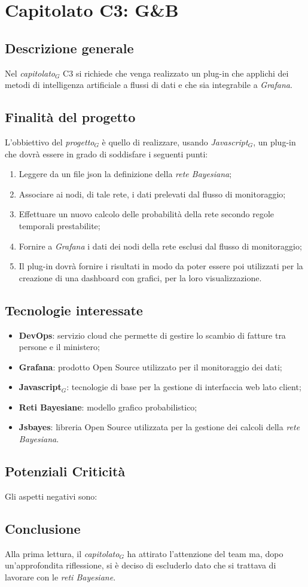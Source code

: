 \chapter{Capitolato C3: G\&B}
\section{Descrizione generale}
Nel \textit{capitolato$_{G}$} C3 si richiede che venga realizzato un plug-in che applichi dei metodi di intelligenza artificiale a flussi di dati e che sia integrabile a \emph{Grafana}.
\section{Finalit\`a del progetto}
L'obbiettivo del \textit{progetto$_{G}$} è quello di realizzare, usando \textit{Javascript$_{G}$}, un plug-in che dovrà essere in grado di soddisfare i seguenti punti:
\begin{enumerate}
	\item Leggere da un file json la definizione della \emph{rete Bayesiana};
	\item Associare ai nodi, di tale rete, i dati prelevati dal flusso di monitoraggio;
	\item Effettuare un nuovo calcolo delle probabilit\`a della rete secondo regole temporali prestabilite;
	\item Fornire a \emph{Grafana} i dati dei nodi della rete esclusi dal flusso di monitoraggio;
	\item Il plug-in dovrà fornire i risultati in modo da poter essere poi utilizzati per la creazione di una dashboard con grafici, per la loro visualizzazione. 
\end{enumerate}
\section{Tecnologie interessate}
\begin{itemize}
	\item \textbf{DevOps}: servizio cloud che permette di gestire lo scambio di fatture tra persone e il ministero;
	\item \textbf{Grafana}: prodotto Open Source utilizzato per il monitoraggio dei dati;
	\item \textbf{Javascript$_{G}$}: tecnologie di base per la gestione di interfaccia web lato client;
	\item \textbf{Reti Bayesiane}: modello grafico probabilistico;
	\item \textbf{Jsbayes}: libreria Open Source utilizzata per la gestione dei calcoli della \emph{rete Bayesiana}.
\end{itemize}
\section{Potenziali Criticità}
Gli aspetti negativi sono:
\section{Conclusione}
Alla prima lettura, il \textit{capitolato$_{G}$} ha attirato l'attenzione del team ma, dopo un'approfondita riflessione, si è deciso di escluderlo dato che si trattava di lavorare con le \emph{reti Bayesiane}.